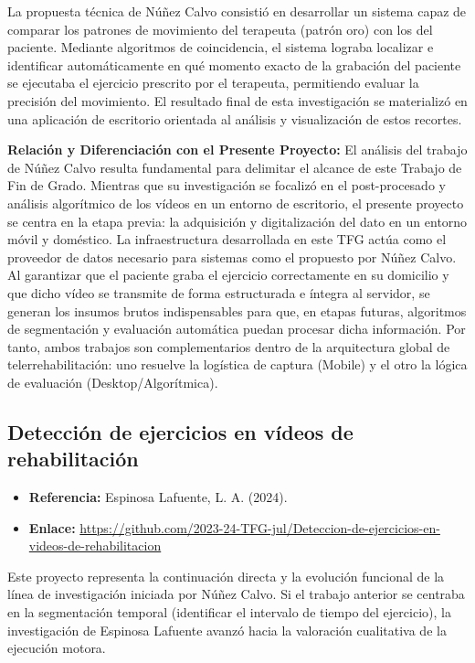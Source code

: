 La propuesta técnica de Núñez Calvo consistió en desarrollar un sistema capaz de comparar los patrones de movimiento del terapeuta (patrón oro) con los del paciente. Mediante algoritmos de coincidencia, el sistema lograba localizar e identificar automáticamente en qué momento exacto de la grabación del paciente se ejecutaba el ejercicio prescrito por el terapeuta, permitiendo evaluar la precisión del movimiento. El resultado final de esta investigación se materializó en una aplicación de escritorio orientada al análisis y visualización de estos recortes.

\textbf{Relación y Diferenciación con el Presente Proyecto:} El análisis del trabajo de Núñez Calvo resulta fundamental para delimitar el alcance de este Trabajo de Fin de Grado. Mientras que su investigación se focalizó en el post-procesado y análisis algorítmico de los vídeos en un entorno de escritorio, el presente proyecto se centra en la etapa previa: la adquisición y digitalización del dato en un entorno móvil y doméstico. La infraestructura desarrollada en este TFG actúa como el proveedor de datos necesario para sistemas como el propuesto por Núñez Calvo. Al garantizar que el paciente graba el ejercicio correctamente en su domicilio y que dicho vídeo se transmite de forma estructurada e íntegra al servidor, se generan los insumos brutos indispensables para que, en etapas futuras, algoritmos de segmentación y evaluación automática puedan procesar dicha información. Por tanto, ambos trabajos son complementarios dentro de la arquitectura global de telerrehabilitación: uno resuelve la logística de captura (Mobile) y el otro la lógica de evaluación (Desktop/Algorítmica).

\subsection{Detección de ejercicios en vídeos de rehabilitación}

\begin{itemize}
    \item \textbf{Referencia:} Espinosa Lafuente, L. A. (2024).
    \item \textbf{Enlace:} \url{https://github.com/2023-24-TFG-jul/Deteccion-de-ejercicios-en-videos-de-rehabilitacion}
\end{itemize}

Este proyecto representa la continuación directa y la evolución funcional de la línea de investigación iniciada por Núñez Calvo. Si el trabajo anterior se centraba en la segmentación temporal (identificar el intervalo de tiempo del ejercicio), la investigación de Espinosa Lafuente avanzó hacia la valoración cualitativa de la ejecución motora.

